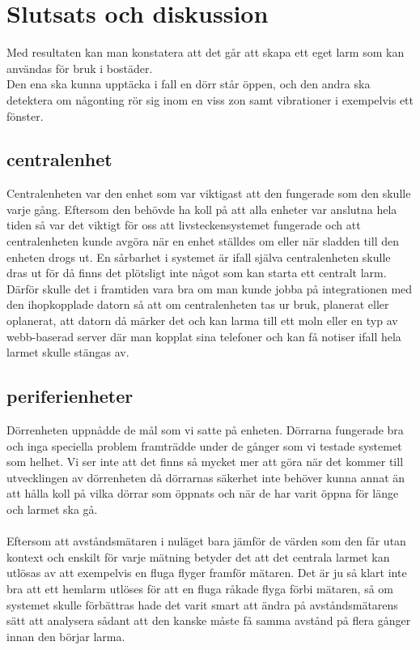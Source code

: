 \documentclass{article}
\begin{document}
\section{Slutsats och diskussion}
Med resultaten kan man konstatera att det går att skapa ett eget larm som kan användas för bruk i bostäder.\\

\noindent
Den ena ska kunna upptäcka i fall en dörr står öppen, och den andra ska detektera om någonting rör sig inom en viss zon samt vibrationer i exempelvis ett fönster. 

\subsection{centralenhet}
Centralenheten var den enhet som var viktigast att den fungerade som den skulle varje gång.
Eftersom den behövde ha koll på att alla enheter var anslutna hela tiden så var det viktigt för oss att livsteckensystemet fungerade och att centralenheten kunde avgöra när en enhet ställdes om eller när sladden till den enheten drogs ut.
En sårbarhet i systemet är ifall själva centralenheten skulle dras ut för då finns det plötsligt inte något som kan starta ett centralt larm. 
Därför skulle det i framtiden vara bra om man kunde jobba på integrationen med den ihopkopplade datorn så att om centralenheten tas ur bruk, planerat eller oplanerat, att datorn då märker det och kan larma till ett moln eller en typ av webb-baserad server där man kopplat sina telefoner och kan få notiser ifall hela larmet skulle stängas av.


\subsection{periferienheter}
\noindent
Dörrenheten uppnådde de mål som vi satte på enheten. 
Dörrarna fungerade bra och inga speciella problem framträdde under de gånger som vi testade systemet som helhet. 
Vi ser inte att det finns så mycket mer att göra när det kommer till utvecklingen av dörrenheten då dörrarnas säkerhet inte behöver kunna annat än att hålla koll på vilka dörrar som öppnats och när de har varit öppna för länge och larmet ska gå.\\
\\
\noindent
Eftersom att avståndsmätaren i nuläget bara jämför de värden som den får utan kontext och enskilt för varje mätning betyder det att det centrala larmet kan utlösas av att exempelvis en fluga flyger framför mätaren.
Det är ju så klart inte bra att ett hemlarm utlöses för att en fluga råkade flyga förbi mätaren, så om systemet skulle förbättras hade det varit smart att ändra på avståndsmätarens sätt att analysera sådant att den kanske måste få samma avstånd på flera gånger innan den börjar larma.\\
\end{document}
